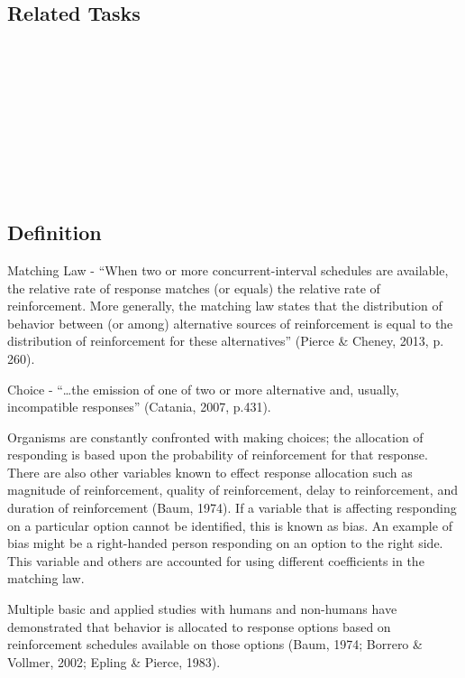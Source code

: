 \subsection{Related Tasks}
\fourcTwo{}\\
\fourdFifteen{}\\
\fourdSixteen{}\\
\fourdSeventeen{}\\
\fourjTen{}\\
\fourkTwo{}\\
\fourFKThirtyEight{}\\
\fourFKFourty{}\\
%
%
%
%
%
%
%
%
%
\section[\foureEight{}]{\foureEight{}%
              }
\subsection{Definition} 
Matching Law - ``When two or more concurrent-interval schedules are available, the relative rate of response matches (or equals) the relative rate of reinforcement. More generally, the matching law states that the distribution of behavior between (or among) alternative sources of reinforcement is equal to the distribution of reinforcement for these alternatives'' (Pierce \& Cheney, 2013, p. 260).

Choice - ``…the emission of one of two or more alternative and, usually, incompatible responses'' (Catania, 2007, p.431).

Organisms are constantly confronted with making choices; the allocation of responding is based upon the probability of reinforcement for that response. There are also other variables known to effect response allocation such as magnitude of reinforcement, quality of reinforcement, delay to reinforcement, and duration of reinforcement (Baum, 1974). If a variable that is affecting responding on a particular option cannot be identified, this is known as bias. An example of bias might be a right-handed person responding on an option to the right side. This variable and others are accounted for using different coefficients in the matching law.

Multiple basic and applied studies with humans and non-humans have demonstrated that behavior is allocated to response options based on reinforcement schedules available on those options (Baum, 1974; Borrero \& Vollmer, 2002; Epling \& Pierce, 1983).

